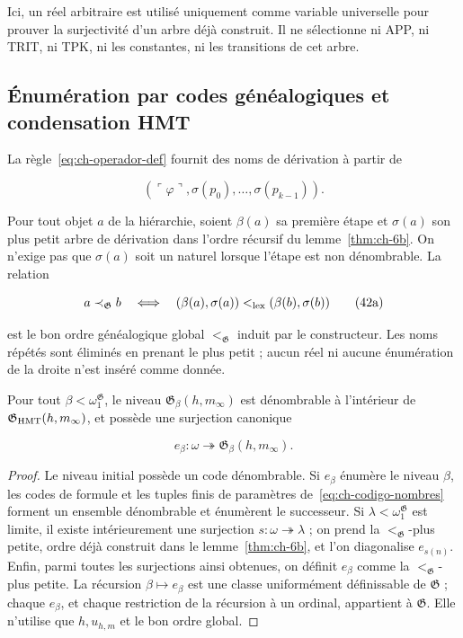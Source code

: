 Ici, un réel arbitraire est utilisé uniquement comme variable universelle pour prouver
la surjectivité d’un arbre déjà construit. Il ne sélectionne ni APP, ni TRIT, ni TPK, ni les
constantes, ni les transitions de cet arbre.

\subsection{Énumération par codes généalogiques et condensation HMT}

La règle~\eqref{eq:ch-operador-def} fournit des noms de dérivation à partir de

\[
 (\ulcorner\varphi\urcorner,
  \sigma(p_0),\ldots,\sigma(p_{k-1})).
\tag{42}\label{eq:ch-codigo-nombres}
\]

Pour tout objet \(a\) de la hiérarchie, soient \(\beta(a)\) sa première
étape et \(\sigma(a)\) son plus petit arbre de dérivation dans l’ordre récursif du
lemme~\ref{thm:ch-6b}. On n’exige pas que \(\sigma(a)\) soit un naturel lorsque l’étape est non
dénombrable. La relation

\[
 a\prec_{\mathfrak G}b
 \quad\Longleftrightarrow\quad
 (\beta(a),\sigma(a))<_{\rm lex}
 (\beta(b),\sigma(b))
\tag{42a}\label{eq:ch-orden-genealogico}
\]

est le bon ordre généalogique global \(<_{\mathfrak G}\) induit par le
constructeur. Les noms répétés sont éliminés en prenant le plus petit ; aucun réel
ni aucune énumération de la droite n’est inséré comme donnée.

\begin{lemma}
\label{thm:ch-7}
Pour tout \(\beta<\omega_1^{\mathfrak G}\), le niveau \(\mathfrak G_\beta(h,m_\infty)\) est dénombrable à l'intérieur de \(\mathfrak G_{\rm HMT}(h,m_\infty)\), et possède une surjection canonique

\[
 e_\beta:\omega\twoheadrightarrow
 \mathfrak G_\beta(h,m_\infty).
\tag{43}\label{eq:ch-enumeracion-niveles}
\]

\end{lemma}
\begin{proof}
Le niveau initial possède un code dénombrable. Si \(e_\beta\) énumère le niveau \(\beta\), les codes de formule et les tuples finis de paramètres de~\eqref{eq:ch-codigo-nombres} forment un ensemble dénombrable et énumèrent le successeur. Si \(\lambda<\omega_1^{\mathfrak G}\) est limite, il existe intérieurement une surjection \(s:\omega\twoheadrightarrow\lambda\) ; on prend la \(<_{\mathfrak G}\)-plus petite, ordre déjà construit dans le lemme~\ref{thm:ch-6b}, et l'on diagonalise \(e_{s(n)}\). Enfin, parmi toutes les surjections ainsi obtenues, on définit \(e_\beta\) comme la \(<_{\mathfrak G}\)-plus petite. La récursion \(\beta\mapsto e_\beta\) est une classe uniformément définissable de \(\mathfrak G\) ; chaque \(e_\beta\), et chaque restriction de la récursion à un ordinal, appartient à \(\mathfrak G\). Elle n'utilise que \(h,u_{h,m}\) et le bon ordre global.
\end{proof}

